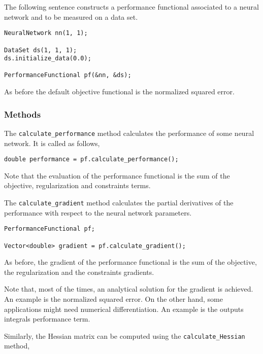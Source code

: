 The following sentence constructs a performance functional associated to a neural network and to be measured on a data set.

\begin{lstlisting}
NeuralNetwork nn(1, 1);

DataSet ds(1, 1, 1);
ds.initialize_data(0.0);

PerformanceFunctional pf(&nn, &ds);
\end{lstlisting}

As before the default objective functional is the normalized squared error. 

\subsubsection*{Methods}


The \lstinline"calculate_performance" method calculates the performance of some neural network. 
It is called as follows, 

\begin{lstlisting}
double performance = pf.calculate_performance();
\end{lstlisting}

Note that the evaluation of the performance functional is the sum of the objective, regularization and constraints terms. 


The \lstinline"calculate_gradient" method calculates the partial derivatives of the performance with respect to the neural network parameters. 

\begin{lstlisting}
PerformanceFunctional pf;

Vector<double> gradient = pf.calculate_gradient();
\end{lstlisting}

As before, the gradient of the performance functional is the sum of the objective, the regularization and the constraints gradients. 

Note that, most of the times, an analytical solution for the gradient is achieved.
An example is the normalized squared error. 
On the other hand, some applications might need numerical differentiation. 
An example is the outputs integrals performance term.


Similarly, the Hessian matrix can be computed using the \lstinline"calculate_Hessian" method, 

